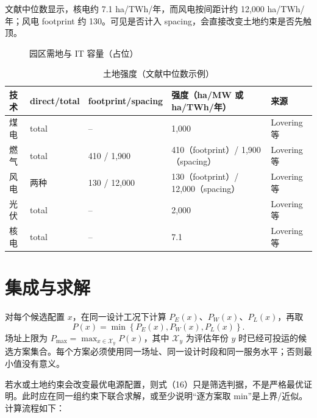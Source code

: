 \documentclass{mcmthesis}
\begin{document}
文献中位数显示，核电约 7.1 ha/TWh/年，而风电按间距计约 12,000 ha/TWh/年；风电 footprint 约 130。可见是否计入 spacing，会直接改变土地约束是否先触顶。

\begin{figure}[H]
\centering
{}
\caption{园区需地与 IT 容量（占位）}
\label{fig:land}
\end{figure}

\begin{table}[H]
\centering
\caption{土地强度（文献中位数示例）}
\label{tab:land}
\small
\begin{tabularx}{\textwidth}{@{}l l l l X@{}}
\toprule
技术 & direct/total & footprint/spacing & 强度（ha/MW 或 ha/TWh/年） & 来源 \\
\midrule
煤电 & total & -- & 1,000 & Lovering 等 \\
燃气 & total & 410 / 1,900 & 410（footprint）/ 1,900（spacing） & Lovering 等 \\
风电 & 两种 & 130 / 12,000 & 130（footprint）/ 12,000（spacing） & Lovering 等 \\
光伏 & total & -- & 2,000 & Lovering 等 \\
核电 & total & -- & 7.1 & Lovering 等 \\
\bottomrule
\end{tabularx}
\end{table}

\section{集成与求解}
\label{sec:integration}

对每个候选配置 \(x\)，在同一设计工况下计算 \(P_E(x)\)、\(P_W(x)\)、\(P_L(x)\)，再取
\begin{equation}
P(x)=\min\left\{P_E(x),P_W(x),P_L(x)\right\}.
\tag{16}
\end{equation}
场址上限为 \(P_{\max}=\max_{x\in\mathcal X_y}P(x)\)，其中 \(\mathcal X_y\) 为评估年份 \(y\) 时已经可投运的候选方案集合。每个方案必须使用同一场址、同一设计时段和同一服务水平；否则最小值没有意义。

若水或土地约束会改变最优电源配置，则式（16）只是筛选判据，不是严格最优证明。此时应在同一组约束下联合求解，或至少说明“逐方案取 min”是上界/近似。计算流程如下：
\end{document}
